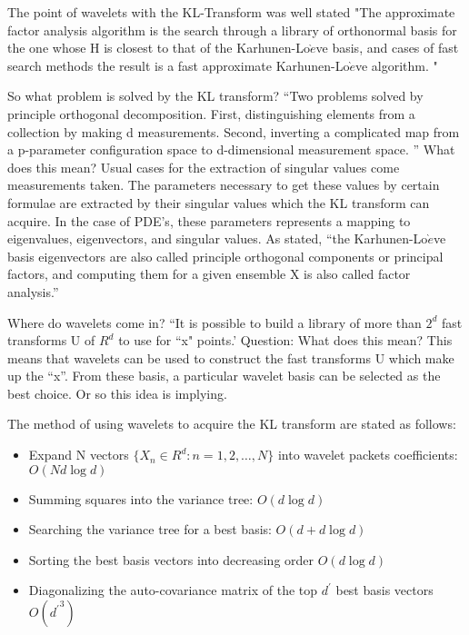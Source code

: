 The point of wavelets with the KL-Transform was well stated "The approximate factor analysis algorithm is the search through a library of orthonormal basis for the one whose H is closest to that of the Karhunen-Lo$\grave{e}$ve basis, and cases of fast search methods the result is a fast approximate Karhunen-Lo$\grave{e}$ve algorithm.  "\cite{victor}  

So what problem is solved by the KL transform?   ``Two problems solved by  principle orthogonal decomposition.  First, distinguishing elements from a collection by making d measurements.  Second, inverting a complicated map from a p-parameter configuration space to d-dimensional measurement space. '' \cite{victor}  What does this mean?  Usual cases for the extraction of singular values come measurements taken.  The parameters necessary to get these values by certain formulae are extracted by their singular values which the KL transform can acquire.  In the case of PDE's, these parameters represents a mapping to eigenvalues, eigenvectors, and singular values.  As stated, ``the Karhunen-Lo$\grave{e}$ve basis eigenvectors are also called principle orthogonal components or principal factors, and computing them for a given ensemble X is also called factor analysis.''\cite{victor}

Where do wavelets come in?   ``It is possible to build a library of more than $2^d$ fast transforms U of $R^d$ to use for ``x" points.'
Question:  What does this mean?  
 This means that wavelets can be used to construct the fast transforms U which make up the ``x''.  From these basis, a particular wavelet basis can be selected as the best choice.  Or so this idea is implying.


The method of using wavelets to acquire the KL transform are stated as follows:  
 \begin{itemize}
\item Expand N vectors $\{X_n \in R^d : n = 1,2, \ldots ,N\}$ into wavelet packets coefficients: $O(Nd\log d)$
 \item Summing squares into the variance tree: $O(d \log d)$
 \item Searching the variance tree for a best basis: $O(d+d\log d)$
 \item Sorting the best basis vectors into decreasing order $O(d \log d)$
 \item Diagonalizing the auto-covariance matrix of the top $d^\prime$ best basis vectors $O({d^\prime}^3)$
\end{itemize}

